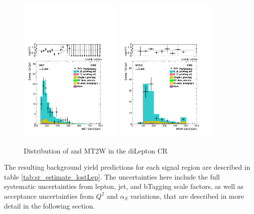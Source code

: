 \begin{figure}[ht]
\centering
\includegraphics[width=0.45\textwidth]{Figures/bkgLostLepton/data_MC_plot__byProductionMode__met__ge3j_ge250met__linScale.pdf}
\includegraphics[width=0.45\textwidth]{Figures/bkgLostLepton/data_MC_plot__byProductionMode__mt2w__ge3j_ge250met__linScale.pdf}
\caption{\label{fig:cr_data_mc:met_mt2w} Distribution of \MET and MT2W in the diLepton CR}
\end{figure}


The resulting background yield predictions for each signal region are described in table \ref{tab:sr_estimate_lostLep}.  
The uncertainties here include the full systematic uncertainties from lepton, jet, and bTagging scale factors, 
as well as acceptance uncertainties from $Q^{2}$ and $\alpha_{S}$ variations, that are described in more detail in the 
following section.

